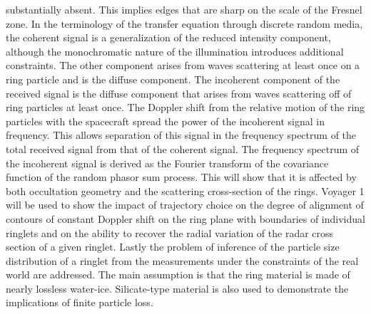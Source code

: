 \documentclass{article}
\theoremstyle{mystyle}
\begin{document}
substantially absent. This implies edges that are sharp on the scale of the Fresnel zone. In the terminology of the transfer equation through discrete random media, the coherent signal is a generalization of the reduced intensity component, although the monochromatic nature of the illumination introduces additional constraints. The other component arises from waves scattering at least once on a ring particle and is the diffuse component. The incoherent component of the received signal is the diffuse component that arises from waves scattering off of ring particles at least once. The Doppler shift from the relative motion of the ring particles with the spacecraft spread the power of the incoherent signal in frequency. This allows separation of this signal in the frequency spectrum of the total received signal from that of the coherent signal. The frequency spectrum of the incoherent signal is derived as the Fourier transform of the covariance function of the random phasor sum process. This will show that it is affected by both occultation geometry and the scattering cross-section of the rings. Voyager 1 will be used to show the impact of trajectory choice on the degree of alignment of contours of constant Doppler shift on the ring plane with boundaries of individual ringlets and on the ability to recover the radial variation of the radar cross section of a given ringlet. Lastly the problem of inference of the particle size distribution of a ringlet from the measurements under the constraints of the real world are addressed. The main assumption is that the ring material is made of nearly lossless water-ice. Silicate-type material is also used to demonstrate the implications of finite particle loss.
\end{document}
